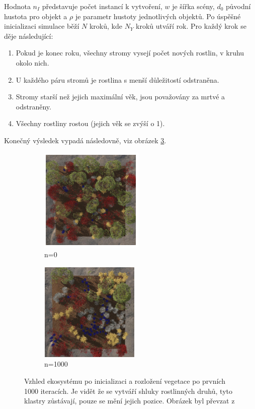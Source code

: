 Hodnota $n_I$ představuje počet instancí k vytvoření, $w$ je šířka scény, $d_0$ původní hustota pro objekt a $\rho$ je parametr hustoty jednotlivých objektů. Po úspěšné inicializaci simulace běží $N$ kroků, kde $N_Y$ kroků utváří rok. Pro každý krok se děje následující:

\begin{enumerate}
	\item Pokud je konec roku, všechny stromy vysejí počet nových rostlin, v kruhu okolo nich.
	\item U každého páru stromů je rostlina s menší důležitostí odstraněna.
	\item Stromy starší než jejich maximální věk, jsou považovány za mrtvé a odstraněny.
	\item Všechny rostliny rostou (jejich věk se zvýší o 1).
\end{enumerate}

Konečný výsledek vypadá následovně, viz obrázek \ref{trees1}.

\begin{figure}[h]
	\centering
	\begin{subfigure}{0.475\textwidth}
		\centering
		\includegraphics[scale=1]{obrazky-figures/treesStart.png}
		\caption{n=0}
		\label{trees0}
	\end{subfigure}
	\begin{subfigure}{0.475\textwidth}
		\centering
		\includegraphics[scale=1]{obrazky-figures/treesEnd.png}
		\caption{n=1000}
		\label{trees1}
	\end{subfigure}
	\caption[generatedTrees]{Vzhled ekosystému po inicializaci a rozložení vegetace po prvních 1000 iteracích. Je vidět že se vytváří shluky rostlinných druhů, tyto klastry zůstávají, pouze se mění jejich pozice. Obrázek byl převzat z \cite{newlands2022procedural}}
\end{figure}

